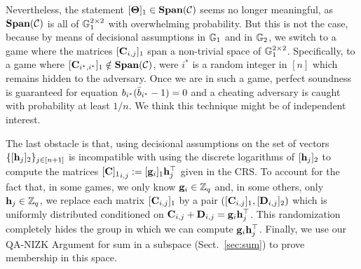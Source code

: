 Nevertheless, the statement $[\mathbf{{\Theta}}]_1\in\mathbf{Span}(\mathcal{C})$ seems no longer meaningful, as $\mathbf{Span}(\mathcal{C})$ is all of $\mathbb{G}_1^{2\times 2}$ with overwhelming probability. But this is not the case, because by means of decisional assumptions in $\mathbb{G}_1$ and in $\mathbb{G}_2$, we switch to a game where the matrices
$[\mathbf{{C}}_{i,j}]_1$ span a non-trivial space of $\mathbb{G}_1^{2 \times 2}$. Specifically, to a game where $[\mathbf{{C}}_{i^*,i^*}]_1\notin\mathbf{Span}(\mathcal{C})$, were $i^*$ is a random integer in $[n]$ which remains hidden to the adversary. Once we are in such a game, perfect soundness is guaranteed for equation $b_{i^*}(\bar{b}_{i^*}-1)=0$ and a cheating adversary is caught with probability at least $1/n$. We think this technique might be of independent interest.

The last obstacle is that, 
  using decisional assumptions on the set of vectors 
  $\{[\mathbf{h}_{j}]_2\}_{j\in[n+1]}$ is incompatible with using the discrete logarithms of $[\mathbf{h}_j]_2$ to compute the matrices ${[\mathbf{{C}}]_1}_{i,j}:=[\mathbf{g}_i]_1 \mathbf{h}_j^{\top}$ given in the CRS. 
To account for the fact that, in some games,
  we only know $\mathbf{g}_i \in \mathbb{Z}_q$ and, in some others,
  only $\mathbf{h}_j \in \mathbb{Z}_q$, we replace each matrix 
  $[\mathbf{{C}}_{i,j}]_1$ by a pair 
  $([\mathbf{{C}}_{i,j}]_1,[\mathbf{{D}}_{i,j}]_2)$ which is uniformly 
  distributed conditioned on 
  $\mathbf{{C}}_{i,j}+\mathbf{{D}}_{i,j}=\mathbf{g}_i \mathbf{h}_j^{\top}$.
This randomization completely hides the group in which we can compute 
  $\mathbf{g}_i \mathbf{h}_j^{\top}$. 
  Finally, we use our QA-NIZK Argument for sum in a subspace (Sect.\ \ref{sec:sum}) to prove membership in this space.

